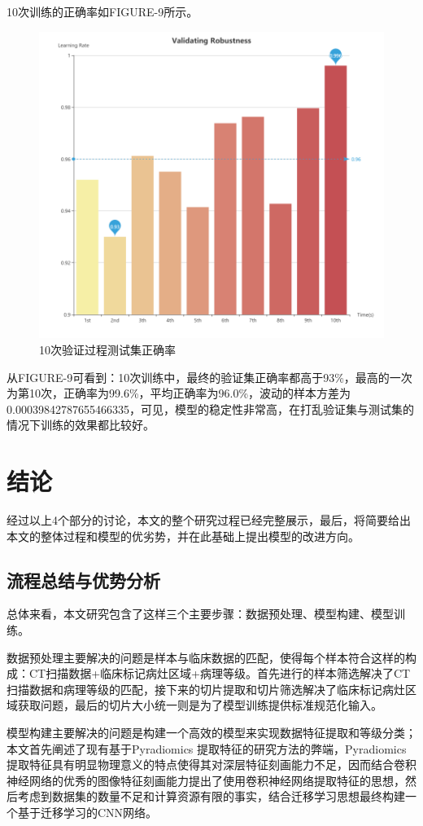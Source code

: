 \documentclass{ctexart}
\begin{document}
10次训练的正确率如FIGURE-9所示。
\begin{figure}[!htbp] 
\centering
\includegraphics[width=\linewidth]{img/VR.png} 
\caption{10次验证过程测试集正确率}
\label{f9} 
\end{figure}

从FIGURE-9可看到：10次训练中，最终的验证集正确率都高于93\%，最高的一次为第10次，正确率为99.6\%，平均正确率为96.0\%，波动的样本方差为0.00039842787655466335，可见，模型的稳定性非常高，在打乱验证集与测试集的情况下训练的效果都比较好。


\section{结论}
经过以上4个部分的讨论，本文的整个研究过程已经完整展示，最后，将简要给出本文的整体过程和模型的优劣势，并在此基础上提出模型的改进方向。
\subsection{流程总结与优势分析}
总体来看，本文研究包含了这样三个主要步骤：数据预处理、模型构建、模型训练。

数据预处理主要解决的问题是样本与临床数据的匹配，使得每个样本符合这样的构成：CT扫描数据+临床标记病灶区域+病理等级。首先进行的样本筛选解决了CT扫描数据和病理等级的匹配，接下来的切片提取和切片筛选解决了临床标记病灶区域获取问题，最后的切片大小统一则是为了模型训练提供标准规范化输入。

模型构建主要解决的问题是构建一个高效的模型来实现数据特征提取和等级分类；本文首先阐述了现有基于Pyradiomics 提取特征的研究方法的弊端，Pyradiomics提取特征具有明显物理意义的特点使得其对深层特征刻画能力不足，因而结合卷积神经网络的优秀的图像特征刻画能力提出了使用卷积神经网络提取特征的思想，然后考虑到数据集的数量不足和计算资源有限的事实，结合迁移学习思想最终构建一个基于迁移学习的CNN网络。
\end{document}
